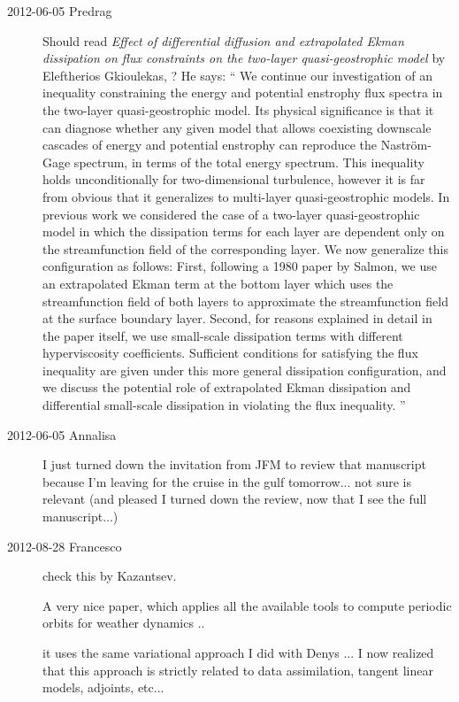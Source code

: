 \begin{description}
\item[2012-06-05 Predrag] Should read
\emph{Effect of differential diffusion and extrapolated Ekman dissipation on
 flux constraints on the two-layer quasi-geostrophic model}
by Eleftherios Gkioulekas,
? He says: ``
 We continue our investigation of an inequality constraining the energy and
potential enstrophy flux spectra in the two-layer quasi-geostrophic model. Its
physical significance is that it can diagnose whether any given model that
allows coexisting downscale cascades of energy and potential enstrophy can
reproduce the Nastr\"om-Gage spectrum, in terms of the total energy spectrum.
This inequality holds unconditionally for two-dimensional turbulence, however
it is far from obvious that it generalizes to multi-layer quasi-geostrophic
models. In previous work we considered the case of a two-layer
quasi-geostrophic model in which the dissipation terms for each layer are
dependent only on the streamfunction field of the corresponding layer. We now
generalize this configuration as follows: First, following a 1980 paper by
Salmon, we use an extrapolated Ekman term at the bottom layer which uses the
streamfunction field of both layers to approximate the streamfunction field at
the surface boundary layer. Second, for reasons explained in detail in the
paper itself, we use small-scale dissipation terms with different
hyperviscosity coefficients. Sufficient conditions for satisfying the flux
inequality are given under this more general dissipation configuration, and we
discuss the potential role of extrapolated Ekman dissipation and differential
small-scale dissipation in violating the flux inequality. ''

\item[2012-06-05 Annalisa] I just turned down the invitation from JFM to
review that manuscript because I'm leaving for the cruise in the gulf
tomorrow... not sure is relevant (and pleased I turned down the
review, now that I see the full manuscript...)

\item[2012-08-28 Francesco] check
{this} by Kazantsev.

A very nice paper, which applies all the available tools to compute
periodic orbits for weather dynamics ..

it uses the same variational approach I did with Denys ... I now realized
that this approach is strictly related to data assimilation, tangent
linear models, adjoints, etc...


\end{description}
